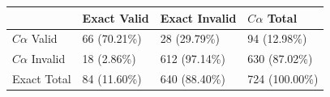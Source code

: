 \begin{tabular}{llll}
\toprule
 & Exact Valid & Exact Invalid & $C\alpha$ Total \\
\midrule
$C\alpha$ Valid & 66 (70.21\%) & 28 (29.79\%) & 94 (12.98\%) \\
$C\alpha$ Invalid & 18 (2.86\%) & 612 (97.14\%) & 630 (87.02\%) \\
Exact Total & 84 (11.60\%) & 640 (88.40\%) & 724 (100.00\%) \\
\bottomrule
\end{tabular}

